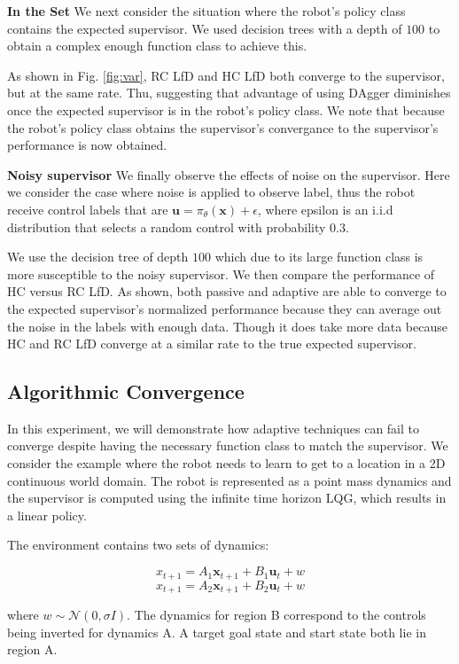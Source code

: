 \documentclass[10pt, conference]{ieeeconf}      %
\newcommand{\bu}{\mathbf{u}}
\newcommand{\bx}{\mathbf{x}}
\begin{document}
\noindent \textbf{In the Set}
We next consider the situation where the robot's policy class contains the expected supervisor. We used decision trees with a depth of $100$ to obtain a complex enough function class to achieve this. 

As shown in Fig. \ref{fig:var}, RC LfD and HC LfD both converge to the supervisor, but at the same rate. Thu, suggesting that advantage of using DAgger diminishes once the expected supervisor is in the robot's policy class. We note that because the robot's policy class obtains the supervisor's convergance to the supervisor's performance is now obtained. 




\noindent \textbf{Noisy supervisor}
We finally observe the effects of noise on the supervisor. Here we consider the case where noise is applied to observe label, thus the robot receive control labels that are $\bu = \pi_{\theta}(\bx) + \epsilon$,  where epsilon is an i.i.d distribution that selects a random control with probability $0.3$.

We use the  decision tree  of depth $100$ which due to its large function class is more susceptible to the noisy supervisor. We then compare the performance of HC versus RC LfD. As shown, both passive and adaptive are able to converge to the expected supervisor's normalized performance because they can average out the noise in the labels with enough data. Though it does take more data because HC and RC LfD converge at a similar rate to the true expected supervisor. 




\subsection{Algorithmic Convergence }
In this experiment, we will demonstrate how adaptive techniques can fail to converge despite having the necessary function class to match the supervisor. 
We  consider the example where the robot needs to learn to get to a location in a 2D continuous world domain. The robot is represented as a point mass dynamics and the supervisor is computed using the infinite time horizon LQG, which results in a linear policy. 

The environment contains two sets of dynamics: 

$$x_{t+1} = A_1\bx_{t+1}+B_1\bu_t+w$$
$$x_{t+1} = A_2\bx_{t+1}+B_2\bu_t + w$$

where $w\sim \mathcal{N}(0,\sigma I)$. The dynamics for region B correspond to the controls being inverted for dynamics A. A target goal state and start state both lie in region A. 
\end{document}
